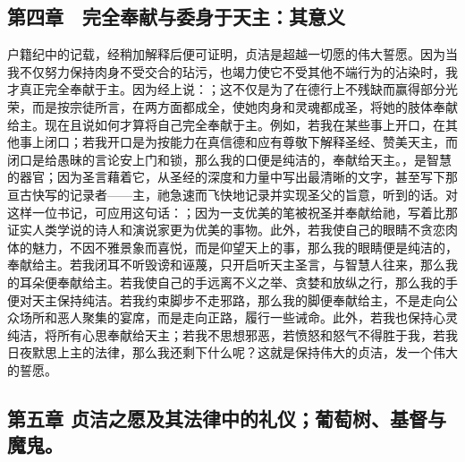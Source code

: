 
\subsection{第四章　完全奉献与委身于天主：其意义}

户籍纪中的记载，经稍加解释后便可证明，贞洁是超越一切愿的伟大誓愿。因为当我不仅努力保持肉身不受交合的玷污，也竭力使它不受其他不端行为的沾染时，我才真正完全奉献于主。因为经上说：；这不仅是为了在德行上不残缺而赢得部分光荣，而是按宗徒所言，在两方面都成全，使她肉身和灵魂都成圣，将她的肢体奉献给主。现在且说如何才算将自己完全奉献于主。例如，若我在某些事上开口，在其他事上闭口；若我开口是为按能力在真信德和应有尊敬下解释圣经、赞美天主，而闭口是给愚昧的言论安上门和锁，那么我的口便是纯洁的，奉献给天主。，是智慧的器官；因为圣言藉着它，从圣经的深度和力量中写出最清晰的文字，甚至写下那亘古快写的记录者——主，祂急速而飞快地记录并实现圣父的旨意，听到的话。对这样一位书记，可应用这句话：；因为一支优美的笔被祝圣并奉献给祂，写着比那证实人类学说的诗人和演说家更为优美的事物。此外，若我使自己的眼睛不贪恋肉体的魅力，不因不雅景象而喜悦，而是仰望天上的事，那么我的眼睛便是纯洁的，奉献给主。若我闭耳不听毁谤和诬蔑，只开启听天主圣言，与智慧人往来，那么我的耳朵便奉献给主。若我使自己的手远离不义之举、贪婪和放纵之行，那么我的手便对天主保持纯洁。若我约束脚步不走邪路，那么我的脚便奉献给主，不是走向公众场所和恶人聚集的宴席，而是走向正路，履行一些诫命。此外，若我也保持心灵纯洁，将所有心思奉献给天主；若我不思想邪恶，若愤怒和怒气不得胜于我，若我日夜默思上主的法律，那么我还剩下什么呢？这就是保持伟大的贞洁，发一个伟大的誓愿。\par


\subsection{第五章 贞洁之愿及其法律中的礼仪；葡萄树、基督与魔鬼。}

